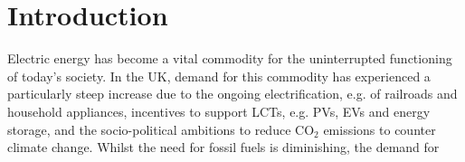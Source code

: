 \chapter{Introduction}

Electric energy has become a vital commodity for the uninterrupted functioning of today's society.
In the UK, demand for this commodity has experienced a particularly steep increase due to the ongoing electrification, e.g. of railroads and household appliances, incentives to support LCTs, e.g. PVs, EVs and energy storage, and the socio-political ambitions to reduce $\text{CO}_2$ emissions to counter climate change.
Whilst the need for fossil fuels is diminishing, the demand for 







